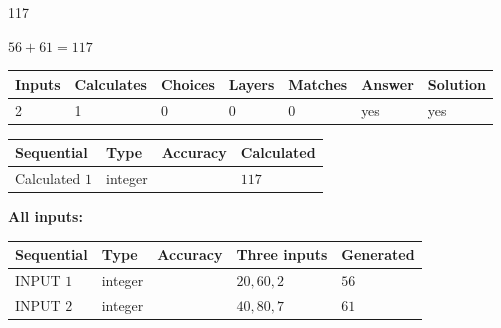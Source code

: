 \documentclass[12pt]{article}
\begin{document}
 

117
 
 
\noindent{}
 
 

 
 
 
\noindent{}
 
 

$ %
56 +  %
61=   %
117$
 
 
\noindent{}
 
 

 
   
   
   
   
\noindent\begin{tabular}{|l|l|l|l|l|l|l|}
 \hline
Inputs & Calculates & Choices & Layers & Matches & Answer & Solution \\ \hline
 2  & 
 1  & 
 0
  & 
 0  & 
 0  & 
  yes & 
  yes 
  \\ \hline
 \end{tabular}
   
   
   
   
\noindent{}
   
   
  
  
\noindent\begin{tabular}{|l|l|l|l|}
\hline
 Sequential & Type & Accuracy & Calculated \\ 
\hline
 
 
  Calculated $  1 $ & integer &  & 
  $ 117 $ 
 \\  \hline  
 \end{tabular}
   
   
   
   
\noindent\vspace{0.1in}\hspace{-0.08in} {\textbf{\Large{All inputs: }}}
   
   
  
  
\noindent\begin{tabular}{|l|l|l|l|l|}
\hline
 Sequential & Type & Accuracy & Three inputs & Generated \\ 
\hline
 
 
  INPUT $  1 $ & integer &  & $
 20
 , 
 60
 , 
 2
 $ & $ 56 $ 
 \\  \hline  
 
 
  INPUT $  2 $ & integer &  & $
 40
 , 
 80
 , 
 7
 $ & $ 61 $ 
 \\  \hline  
 \end{tabular}
   
\end{document}
